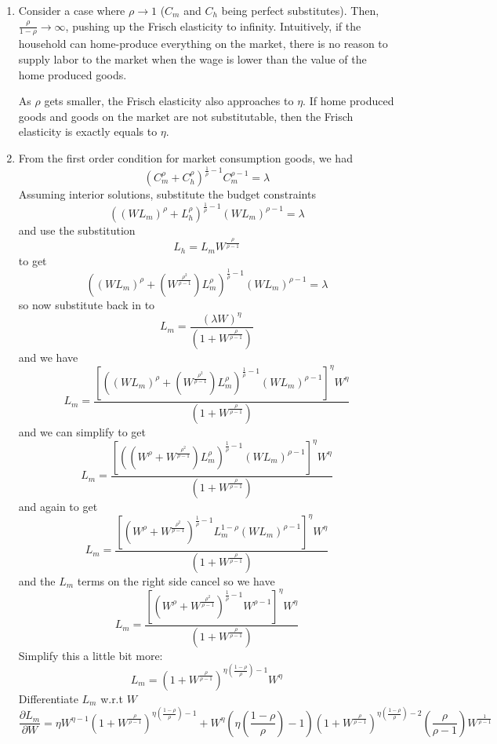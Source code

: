 \documentclass[11pt]{amsart}
\begin{document}
\begin{enumerate}[label = (\alph*)]
	\item Consider a case where $\rho \rightarrow 1$ ($C_m$ and $C_h$ being perfect substitutes). Then, $\frac{\rho}{1 - \rho} \rightarrow \infty$, pushing up the Frisch elasticity to infinity. Intuitively, if the household can home-produce everything on the market, there is no reason to supply labor to the market when the wage is lower than the value of the home produced goods. 
	
	As $\rho$ gets smaller, the Frisch elasticity also approaches to $\eta$. If home produced goods and goods on the market are not substitutable, then the Frisch elasticity is exactly equals to $\eta$. 
	
	\item
	From the first order condition for market consumption goods, we had
	\[
	\left( C_m^\rho + C_h^\rho \right)^{\frac{1}{\rho} -1}  C_m^{\rho-1} = \lambda
	\]
	Assuming interior solutions, substitute the budget constraints
	\[
	((W L_m)^{\rho} + L_h^{\rho})^{\frac{1}{\rho} -1} (W L_m)^{\rho-1} = \lambda
	\]
	and use the substitution
	\[
	L_h = L_m W^{\frac{\rho}{\rho-1}}
	\]
	to get
	\[
	((W L_m)^{\rho} + ( W^{\frac{\rho^2}{\rho-1}}) L_m^{\rho})^{\frac{1}{\rho} -1} (W L_m)^{\rho-1} = \lambda
	\]
	so now substitute back in to
	\[
	L_m = \frac{(\lambda W)^{\eta}}{(1 + W^{\frac{\rho}{\rho-1}})}
	\]
	and we have
	\[
	L_m = \frac{ \left[((W L_m)^{\rho} + ( W^{\frac{\rho^2}{\rho-1}}) L_m^{\rho})^{\frac{1}{\rho} -1} (W L_m)^{\rho-1}\right]^{\eta} W^{\eta}}{(1 + W^{\frac{\rho}{\rho-1}})}
	\]
	and we can simplify to get
	\[
	L_m = \frac{ \left[((W^{\rho} + W^{\frac{\rho^2}{\rho-1}}) L_m^{\rho})^{\frac{1}{\rho} -1} (W L_m)^{\rho-1}\right]^{\eta} W^{\eta}}{(1 + W^{\frac{\rho}{\rho-1}})}
	\]
	and again to get
	\[
	L_m = \frac{ \left[(W^{\rho} + W^{\frac{\rho^2}{\rho-1}})^{\frac{1}{\rho} -1} L_m^{1-\rho} (W L_m)^{\rho-1}\right]^{\eta} W^{\eta}}{(1 + W^{\frac{\rho}{\rho-1}})}
	\]
	and the $L_m$ terms on the right side cancel so we have
	\[
	L_m = \frac{ \left[(W^{\rho} + W^{\frac{\rho^2}{\rho-1}})^{\frac{1}{\rho} -1}  W ^{\rho-1}\right]^{\eta} W^{\eta}}{(1 + W^{\frac{\rho}{\rho-1}})}
	\]
	Simplify this a little bit more:
	\begin{equation*}
	L_m = \left( 1 + W^{\frac{\rho}{\rho-1}} \right)^{\eta \left( \frac{1-\rho}{\rho} \right) -1} W^\eta
	\end{equation*}
	Differentiate $L_m$ w.r.t $W$
	\begin{equation*}
	\frac{\partial L_m}{\partial W} = \eta W^{\eta -1 } \left( 1 + W^{\frac{\rho}{\rho-1}} \right)^{\eta \left( \frac{1-\rho}{\rho} \right) -1} + W^\eta \left( \eta \left( \frac{1-\rho}{\rho} \right) -1  \right)  \left( 1 + W^{\frac{\rho}{\rho-1}} \right)^{\eta \left( \frac{1-\rho}{\rho} \right) -2} \left( \frac{\rho}{\rho-1} \right) W^{\frac{1}{\rho-1}}

\end{equation*}
\end{enumerate}
\end{document}
